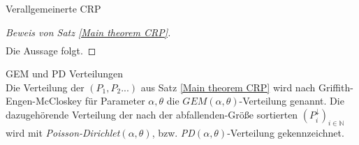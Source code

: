 \begin{section}{Verallgemeinerte CRP}
\begin{proof}[Beweis von Satz \ref{Main theorem CRP}]
\begin{align*}
    \end{align*}
Die Aussage folgt.
\end{proof}
\begin{Definition}\textnormal{GEM und PD Verteilungen}\\
Die Verteilung der $(P_1,P_2...)$ aus Satz \ref{Main theorem CRP} wird nach Griffith-Engen-McCloskey für Parameter $\alpha,\theta$ die $GEM(\alpha,\theta)$-Verteilung genannt. Die dazugehörende Verteilung der nach der abfallenden-Größe sortierten $(P^{\downarrow}_i)_{i \in \mathbb{N}}$ wird mit \textit{Poisson-Dirichlet}$(\alpha,\theta)$, bzw. \textit{PD}$(\alpha,\theta)$-Verteilung gekennzeichnet. 
\end{Definition}
\end{section}